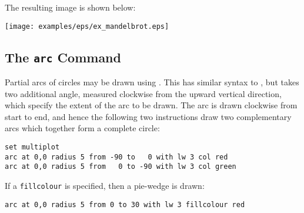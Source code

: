 {\newline
{}\newline
{}\newline
\noindent {\tt \phantom{xxx}\} }\newline
{}\newline
\noindent {\tt \phantom{x}\} }\newline
\noindent {\tt }\newline
{}\newline
{}\newline
{}\newline
\nlscf
The resulting image is shown below:
\nlscf
\begin{center}
\texttt{[image: examples/eps/ex\_mandelbrot.eps]}
\end{center}
}

\subsection{The {\tt arc} Command}
\label{sec:arc}

Partial arcs of circles may be drawn using . This has similar
syntax to , but takes two additional angle, measured clockwise
from the upward vertical direction, which specify the extent of the arc to be
drawn. The arc is drawn clockwise from start to end, and hence the following
two instructions draw two complementary arcs which together form a complete
circle:

\begin{verbatim}
set multiplot
arc at 0,0 radius 5 from -90 to   0 with lw 3 col red
arc at 0,0 radius 5 from   0 to -90 with lw 3 col green
\end{verbatim}

\noindent If a {\tt fillcolour} is specified, then a pie-wedge is drawn:

\begin{verbatim}
arc at 0,0 radius 5 from 0 to 30 with lw 3 fillcolour red
\end{verbatim}

